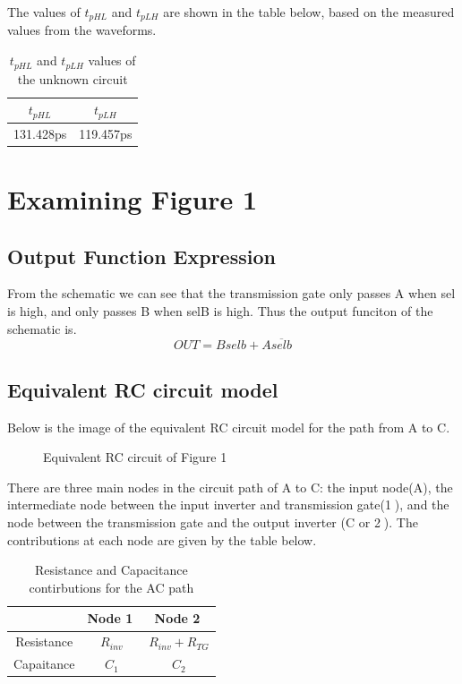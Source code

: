 \documentclass[12pt]{article}
\begin{document}
The values of $t_{pHL}$ and $t_{pLH}$ are shown in the table below, based on the measured values from the waveforms.
\begin{table} [H]
    \centering
    \begin{tabular} {cc}
        $t_{pHL}$ & $t_{pLH}$ \\
        \hline
        131.428ps & 119.457ps
    \end{tabular}
    \caption{$t_{pHL}$ and $t_{pLH}$ values of the unknown circuit}
\end{table}
\pagebreak


\section{Examining Figure 1}
\subsection{Output Function Expression}
From the schematic we can see that the transmission gate only passes A when sel is high, and only passes B when selB is high. Thus
the output funciton of the schematic is.
\[OUT = Bselb + A\overline{selb} \]
\subsection{Equivalent RC circuit model}
Below is the image of the equivalent RC circuit model for the path from A to C. 
\begin{figure} [H]
    \centering 
    \caption{Equivalent RC circuit of Figure 1}
\end{figure}
There are three main nodes in the circuit path of A to C: the input node(A), the intermediate node between the input inverter and transmission gate(\textcircled{1}), and the node between the transmission gate and the output inverter (C or \textcircled{2}). The contributions at each node are given by the table below.
\begin{table} [H]
    \centering
    \begin{tabular} {ccc}
         & Node \textcircled{1} & Node \textcircled{2}\\
        \hline
        Resistance & $R_{inv}$ & $R_{inv} + R_{TG}$\\
        Capaitance & $C_1$ & $C_2$
    \end{tabular}
    \caption{Resistance and Capacitance contirbutions for the AC path}
\end{table}
\end{document}
